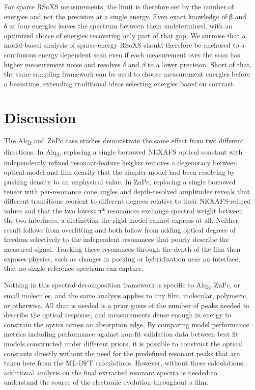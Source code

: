 For sparse RSoXS measurements, the limit is therefore set by the number of energies and not the precision at a single energy. Even exact knowledge of β and δ at four energies leaves the spectrum between them undetermined, with an optimized choice of energies recovering only part of that gap. We surmise that a model-based analysis of sparse-energy RSoXS should therefore be anchored to a continuous energy dependent scan even if each measurement over the scan has higher measurement noise and resolves \(\delta\) and \(\beta\) to a lower precision. Short of that, the same sampling framework can be used to choose measurement energies before a beamtime, extending traditional ideas selecting energies based on contrast.

\section{Discussion}\label{sec:discussion}

The Alq\textsubscript{3} and ZnPc case studies demonstrate the same effect from two different directions. In Alq\textsubscript{3}, replacing a single borrowed NEXAFS optical constant with independently refined resonant-feature heights removes a degeneracy between optical model and film density that the simpler model had been resolving by pushing density to an unphysical value. In ZnPc, replacing a single borrowed tensor with per-resonance cone angles and depth-resolved amplitudes reveals that different transitions reorient to different degrees relative to their NEXAFS-refined values and that the two lowest π* resonances exchange spectral weight between the two interfaces, a distinction the rigid model cannot express at all. Neither result follows from overfitting and both follow from adding optical degrees of freedom selectively to the independent resonances that poorly describe the measured signal. Tracking these resonances through the depth of the film then exposes physics, such as changes in packing or hybridization near an interface, that no single reference spectrum can capture.

Nothing in this spectral-decomposition framework is specific to Alq\textsubscript{3}, ZnPc, or small molecules, and the same analysis applies to any film, molecular, polymeric, or otherwise. All that is needed is a prior guess of the number of peaks needed to describe the optical response, and measurements dense enough in energy to constrain the optics across an absorption edge. By comparing model performance metrics including performance against non-fit validation data between best fit models constructed under different priors, it is possible to construct the optical constants directly without the need for the predefined resonant peaks that are taken here from the ML-DFT calculations. However, without these calculations, additional analysis on the final extracted resonant spectra is needed to understand the source of the electronic evolution throughout a film.

